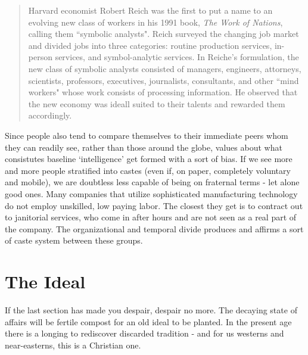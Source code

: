 \documentclass[letterpaper]{article}
\begin{document}
\begin{quote}
  Harvard economist Robert Reich was the first to put a name to an evolving new class of workers in his 1991 book, \textit{The Work of Nations}, calling them ``symbolic analysts". Reich surveyed the changing job market and divided jobs into three categories: routine production services, in-person services, and symbol-analytic services. In Reiche's formulation, the new class of symbolic analysts consisted of managers, engineers, attorneys, scientists, professors, executives, journalists, consultants, and other ``mind workers" whose work consists of processing information. He observed that the new economy was ideall suited to their talents and rewarded them accordingly.
\end{quote}


Since people also tend to compare themselves to their immediate peers whom they can readily see, rather than those around the globe, values about what consistutes baseline `intelligence' get formed with a sort of bias. If we see more and more people stratified into castes (even if, on paper, completely voluntary and mobile), we are doubtless less capable of being on fraternal terms - let alone good ones. Many companies that utilize sophisticated manufacturing technology do not employ unskilled, low paying labor. The closest they get is to contract out to janitorial services, who come in after hours and are not seen as a real part of the company. The organizational and temporal divide produces and affirms a sort of caste system between these groups.

\section{The Ideal}

If the last section has made you despair, despair no more. The decaying state of affairs will be fertile compost for an old ideal to be planted. In the present age there is a longing to rediscover discarded tradition - and for us westerns and near-easterns, this is a Christian one.
\end{document}
